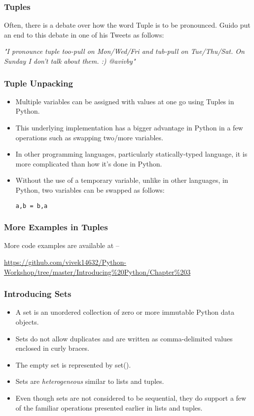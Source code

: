 \documentclass{beamer}
\begin{document}
\begin{frame}
\frametitle{Tuples}
Often, there is a debate over how the word Tuple is to be pronounced. Guido put an end to this debate in one of his Tweets as follows:

\textit{"I pronounce tuple too-pull on Mon/Wed/Fri and tub-pull on Tue/Thu/Sat. On Sunday I don't talk about them. :) @avivby"}
\end{frame}

\begin{frame}[fragile]
\frametitle{Tuple Unpacking}
\begin{itemize}
\item Multiple variables can be assigned with values at one go using Tuples in Python.
\item This underlying implementation has a bigger advantage in Python in a few  operations such as swapping two/more variables.
\item In other programming languages, particularly statically-typed language, it is more complicated than how it's done in Python.
\item Without the use of a temporary variable, unlike in other languages, in Python, two variables can be swapped as follows:
\begin{lstlisting}
a,b = b,a
\end{lstlisting}
\end{itemize}
\end{frame}

\begin{frame}
\frametitle{More Examples in Tuples}
More code examples are available at --
 
\url{https://github.com/vivek14632/Python-Workshop/tree/master/Introducing\%20Python/Chapter\%203}
\end{frame}

\begin{frame}
\frametitle{Introducing Sets}
\begin{itemize}
\item A set is an unordered collection of zero or more immutable Python data objects. 
\item Sets do not allow duplicates and are written as comma-delimited values enclosed in curly braces. 
\item The empty set is represented by set(). \item Sets are \textit{heterogeneous} similar to lists and tuples.
\item Even though sets are not considered to be sequential, they do support a few of the familiar operations presented earlier in lists and tuples.
\end{itemize}
\end{frame}
\end{document}
